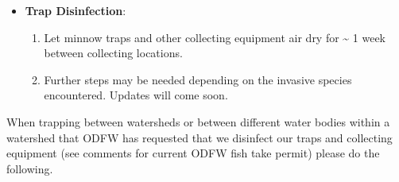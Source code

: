 \documentclass[
  letterpaper,
  DIV=11,
  numbers=noendperiod]{scrreprt}
\providecommand{\tightlist}{%
  \setlength{\itemsep}{0pt}\setlength{\parskip}{0pt}}\usepackage{longtable,booktabs,array}
\begin{document}
\begin{itemize}
\item
  \textbf{Trap Disinfection}:

  \begin{enumerate}
  \def\labelenumi{\arabic{enumi}.}
  \tightlist
  \item
    Let minnow traps and other collecting equipment air dry for
    \textasciitilde{} 1 week between collecting locations.
  \item
    Further steps may be needed depending on the invasive species
    encountered. Updates will come soon.
  \end{enumerate}
\end{itemize}

\begin{tcolorbox}[enhanced jigsaw, rightrule=.15mm, title=\textcolor{quarto-callout-warning-color}{\faExclamationTriangle}\hspace{0.5em}{TRAP DISINFECTION}, titlerule=0mm, opacitybacktitle=0.6, toprule=.15mm, bottomrule=.15mm, opacityback=0, left=2mm, colframe=quarto-callout-warning-color-frame, breakable, coltitle=black, colback=white, colbacktitle=quarto-callout-warning-color!10!white, bottomtitle=1mm, leftrule=.75mm, toptitle=1mm, arc=.35mm]

When trapping between watersheds or between different water bodies
within a watershed that ODFW has requested that we disinfect our traps
and collecting equipment (see comments for current ODFW fish take
permit) please do the following.

\end{tcolorbox}
\end{document}
